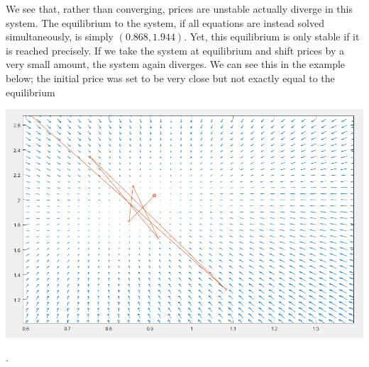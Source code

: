 \documentclass[12pt]{article}
\begin{document}
We see that, rather than converging, prices are unstable actually diverge in this system. The equilibrium to the system, if all equations are instead solved simultaneously, is simply $(0.868,1.944)$. Yet, this equilibrium is only stable if it is reached precisely. If we take the system at equilibrium and shift prices by a very small amount, the system again diverges. We can see this in the example below; the initial price was set to be very close but not exactly equal to the equilibrium

\begin{center}
	\includegraphics[scale = 0.5]{figures/vector_field3}
\end{center}
. 
\end{document}
